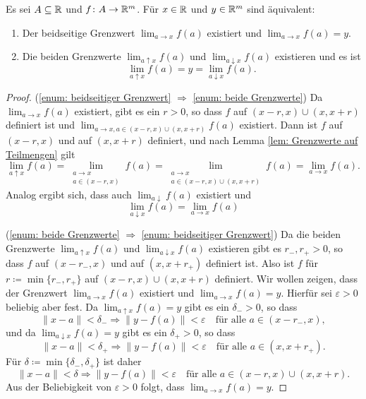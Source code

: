 \documentclass[a4paper,10pt]{article}
\begin{document}
\begin{lem}
 Es sei $A \subseteq \mathbb{R}$ und $f \colon A \to \mathbb{R}^m$. Für $x \in \mathbb{R}$ und $y \in \mathbb{R}^m$ sind äquivalent:
 \begin{enumerate}
  \item\label{enum: beidseitiger Grenzwert}
   Der beidseitige Grenzwert $\lim_{a \to x} f(a)$ existiert und $\lim_{a \to x} f(a) = y$.
  \item\label{enum: beide Grenzwerte}
   Die beiden Grenzwerte $\lim_{a \uparrow x} f(a)$ und $\lim_{a \downarrow x} f(a)$ existieren und es ist
   \[
    \lim_{a \uparrow x} f(a) = y = \lim_{a \downarrow x} f(a).
   \]
 \end{enumerate}
\end{lem}
\begin{proof}
 (\ref{enum: beidseitiger Grenzwert} $\Rightarrow$ \ref{enum: beide Grenzwerte}) Da $\lim_{a \to x} f(a)$ existiert, gibt es ein $r > 0$, so dass $f$ auf $(x-r,x) \cup (x,x+r)$ definiert ist und $\lim_{a \to x, a \in (x-r,x) \cup (x,x+r)} f(a)$ existiert. Dann ist $f$ auf $(x-r,x)$ und auf $(x,x+r)$ definiert, und nach Lemma \ref{lem: Grenzwerte auf Teilmengen} gilt
 \[
  \lim_{a \uparrow x} f(a)
  = \lim_{\substack{a \to x \\ a \in (x-r,x)}} f(a)
  = \lim_{\substack{a \to x \\ a \in (x-r,x) \cup (x,x+r)}} f(a)
  = \lim_{a \to x} f(a).
 \]
 Analog ergibt sich, dass auch $\lim_{a \downarrow} f(a)$ existiert und
 \[
  \lim_{a \downarrow x} f(a) = \lim_{a \to x} f(a)
 \]
 
 (\ref{enum: beide Grenzwerte} $\Rightarrow$ \ref{enum: beidseitiger Grenzwert}) Da die beiden Grenzwerte $\lim_{a \uparrow x} f(a)$ und $\lim_{a \downarrow x} f(a)$ existieren gibt es $r_-, r_+ > 0$, so dass $f$ auf $(x-r_-,x)$ und auf $(x,x+r_+)$ definiert ist. Also ist $f$ für \mbox{$r \coloneqq \min\{r_-, r_+\}$} auf $(x-r,x) \cup (x,x+r)$ definiert. Wir wollen zeigen, dass der Grenzwert $\lim_{a \to x} f(a)$ existiert und $\lim_{a \to x} f(a) = y$. Hierfür sei $\varepsilon > 0$ beliebig aber fest. Da $\lim_{a \uparrow x} f(a) = y$ gibt es ein $\delta_- > 0$, so dass
 \[
  \|x-a\| < \delta_- \Rightarrow \|y-f(a)\| < \varepsilon
  \quad \text{für alle $a \in (x-r_-,x)$},
 \]
 und da $\lim_{a \downarrow x} f(a) = y$ gibt es ein $\delta_+ > 0$, so dass
 \[
  \|x-a\| < \delta_+ \Rightarrow \|y-f(a)\| < \varepsilon
  \quad \text{für alle $a \in (x,x+r_+)$}.
 \]
 Für $\delta \coloneqq \min\{\delta_-, \delta_+\}$ ist daher
 \[
  \|x-a\| < \delta \Rightarrow \|y-f(a)\| < \varepsilon
  \quad \text{für alle $a \in (x-r,x) \cup (x,x+r)$}.
 \]
 Aus der Beliebigkeit von $\varepsilon > 0$ folgt, dass $\lim_{a \to x} f(a) = y$.
\end{proof}
\end{document}
